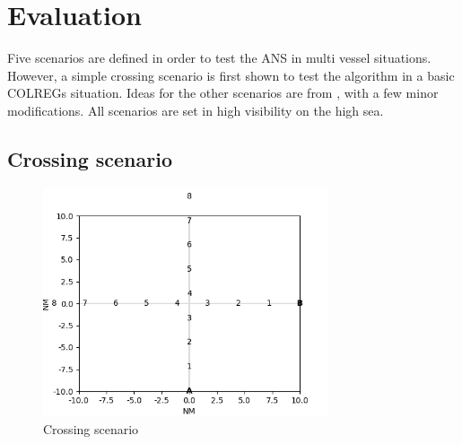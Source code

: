 \chapter{Evaluation}%


\label{sec:evaluation}
Five scenarios are defined in order to test the ANS in multi vessel situations. However, a simple crossing scenario is first shown to test the algorithm in a basic COLREGs situation. Ideas for the other scenarios are from \textcite{ecolreg_overtaking-and-crossing-2,ecolreg_overtaking-and-crossing-3,ecolreg_overtaking-and-crossing,ecolreg_overtaking-and-head-on}, with a few minor modifications. All scenarios are set in high visibility on the high sea.



\section{Crossing scenario}%


\begin{figure}[H]
    \centering
    \includegraphics[width=0.75\textwidth,height=0.75\textheight,keepaspectratio]{../src/img/crossing.png}
    \caption{Crossing scenario}
    \label{fig:simple-scen}
\end{figure}

